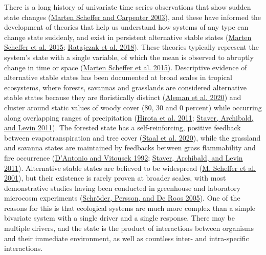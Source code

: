 \documentclass[
  12pt,
]{article}
\begin{document}
There is a long history of univariate time series observations that show
sudden state changes (\protect\hyperlink{ref-Scheffer2003}{Marten
Scheffer and Carpenter 2003}), and these have informed the development
of theories that help us understand how systems of any type can change
state suddenly, and exist in persistent alternative stable states
(\protect\hyperlink{ref-Scheffer2015}{Marten Scheffer et al. 2015};
\protect\hyperlink{ref-Ratajczak2018}{Ratajczak et al. 2018}). These
theories typically represent the system's state with a single variable,
of which the mean is observed to abruptly change in time or space
(\protect\hyperlink{ref-Scheffer2015}{Marten Scheffer et al. 2015}).
Descriptive evidence of alternative stable states has been documented at
broad scales in tropical ecosystems, where forests, savannas and
grasslands are considered alternative stable states because they are
floristically distinct (\protect\hyperlink{ref-Aleman2020}{Aleman et al.
2020}) and cluster around static values of woody cover (80, 30 and 0
percent) while occurring along overlapping ranges of precipitation
(\protect\hyperlink{ref-Hirota2011}{Hirota et al. 2011};
\protect\hyperlink{ref-Staver2011}{Staver, Archibald, and Levin 2011}).
The forested state has a self-reinforcing, positive feedback between
evapotranspiration and tree cover
(\protect\hyperlink{ref-Staal2020}{Staal et al. 2020}), while the
grassland and savanna states are maintained by feedbacks between grass
flammability and fire occurrence
(\protect\hyperlink{ref-DAntonio1992}{D'Antonio and Vitousek 1992};
\protect\hyperlink{ref-Staver2011}{Staver, Archibald, and Levin 2011}).
Alternative stable states are believed to be widespread
(\protect\hyperlink{ref-Scheffer2001}{M. Scheffer et al. 2001}), but
their existence is rarely proven at broader scales, with most
demonstrative studies having been conducted in greenhouse and laboratory
microcosm experiments (\protect\hyperlink{ref-Schroder2005}{Schröder,
Persson, and De Roos 2005}). One of the reasons for this is that
ecological systems are much more complex than a simple bivariate system
with a single driver and a single response. There may be multiple
drivers, and the state is the product of interactions between organisms
and their immediate environment, as well as countless inter- and
intra-specific interactions.
\end{document}

